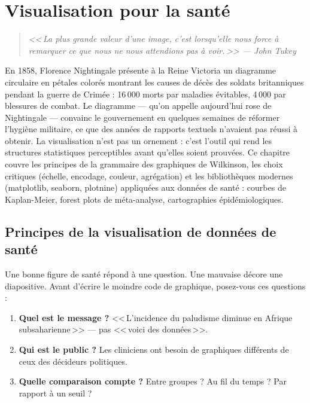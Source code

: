 \chapter{Visualisation pour la sant\'e}
\label{ch:visualisation}

\begin{quote}
\emph{<<\,La plus grande valeur d'une image, c'est lorsqu'elle nous force \`a remarquer ce que nous ne nous attendions pas \`a voir.\,>> --- John Tukey}
\end{quote}

En 1858, Florence Nightingale présente à la Reine Victoria un diagramme circulaire en pétales colorés montrant les causes de décès des soldats britanniques pendant la guerre de Crimée : 16\,000 morts par maladies évitables, 4\,000 par blessures de combat. Le diagramme --- qu'on appelle aujourd'hui rose de Nightingale --- convainc le gouvernement en quelques semaines de réformer l'hygiène militaire, ce que des années de rapports textuels n'avaient pas réussi à obtenir. La visualisation n'est pas un ornement : c'est l'outil qui rend les structures statistiques perceptibles avant qu'elles soient prouvées. Ce chapitre couvre les principes de la grammaire des graphiques de Wilkinson, les choix critiques (échelle, encodage, couleur, agrégation) et les bibliothèques modernes (matplotlib, seaborn, plotnine) appliquées aux données de santé : courbes de Kaplan-Meier, forest plots de méta-analyse, cartographies épidémiologiques.

\section{Principes de la visualisation de donn\'ees de sant\'e}

Une bonne figure de sant\'e r\'epond \`a une question. Une mauvaise d\'ecore une diapositive. Avant d'\'ecrire le moindre code de graphique, posez-vous ces questions :
\begin{enumerate}
  \item \textbf{Quel est le message ?} <<\,L'incidence du paludisme diminue en Afrique subsaharienne\,>> --- pas <<\,voici des donn\'ees\,>>.
  \item \textbf{Qui est le public ?} Les cliniciens ont besoin de graphiques diff\'erents de ceux des d\'ecideurs politiques.
  \item \textbf{Quelle comparaison compte ?} Entre groupes ? Au fil du temps ? Par rapport \`a un seuil ?
\end{enumerate}

